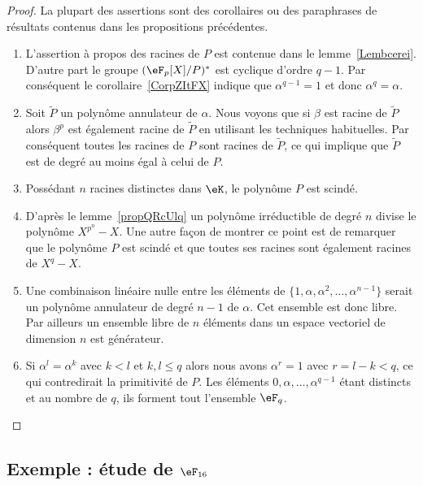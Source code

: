 \begin{proof}
    La plupart des assertions sont des corollaires ou des paraphrases de résultats contenus dans les propositions précédentes.
    \begin{enumerate}
        \item
            L'assertion à propos des racines de \( P\) est contenue dans le lemme~\ref{Lembcerei}. D'autre part le groupe \( (\eF_p[X]/P)^*\) est cyclique d'ordre \( q-1\). Par conséquent le corollaire~\ref{CorpZItFX} indique que \( \alpha^{q-1}=1\) et donc \( \alpha^q=\alpha\).
        \item
            Soit \( \tilde P\) un polynôme annulateur de \( \alpha\). Nous voyons que si \( \beta\) est racine de \( \tilde P\) alors \( \beta^p\) est également racine de \( \tilde P\) en utilisant les techniques habituelles. Par conséquent toutes les racines de \( P\) sont racines de \( \tilde P\), ce qui implique que \( \tilde P\) est de degré au moins égal à celui de \( P\).
        \item
            Possédant \( n\) racines distinctes dans \( \eK\), le polynôme \( P\) est scindé.
        \item
            D'après le lemme~\ref{propQRcUlq} un polynôme irréductible de degré \( n\) divise le polynôme \( X^{p^n}-X\). Une autre façon de montrer ce point est de remarquer que le polynôme \( P\) est scindé et que toutes ses racines sont également racines de \( X^q-X\).
        \item
            Une combinaison linéaire nulle entre les éléments de \( \{ 1,\alpha,\alpha^2,\ldots, \alpha^{n-1} \}\) serait un polynôme annulateur de degré \( n-1\) de \( \alpha\). Cet ensemble est donc libre. Par ailleurs un ensemble libre de \( n\) éléments dans un espace vectoriel de dimension \( n\) est générateur.
        \item
            Si \( \alpha^l=\alpha^k\) avec \( k<l\) et \( k,l\leq q\) alors nous avons \( \alpha^r=1\) avec \( r=l-k<q\), ce qui contredirait la primitivité de \( P\). Les éléments \( 0,\alpha,\ldots, \alpha^{q-1}\) étant distincts et au nombre de \( q\), ils forment tout l'ensemble \( \eF_q\).

    \end{enumerate}
\end{proof}

\subsection{Exemple : étude de \texorpdfstring{$\eF_{16}$}{F16}}


